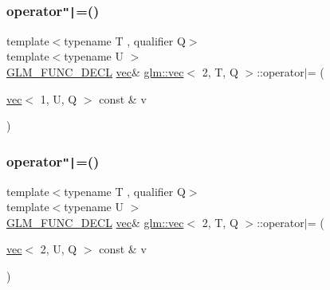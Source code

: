 \mbox{\label{structglm_1_1vec_3_012_00_01_t_00_01_q_01_4_aa5a9bdd476d4095d33cd04662df20fcb}} 
\subsubsection{\texorpdfstring{operator\texttt{"|}=()}{operator|=()}\hspace{0.1cm}{\footnotesize\ttfamily [2/6]}}
{\footnotesize\ttfamily template$<$typename T , qualifier Q$>$ \\
template$<$typename U $>$ \\
\mbox{\hyperlink{setup_8hpp_ab2d052de21a70539923e9bcbf6e83a51}{G\+L\+M\+\_\+\+F\+U\+N\+C\+\_\+\+D\+E\+CL}} \mbox{\hyperlink{structglm_1_1vec}{vec}}\& \mbox{\hyperlink{structglm_1_1vec}{glm\+::vec}}$<$ 2, T, Q $>$\+::operator$\vert$= (\begin{DoxyParamCaption}\item[{\mbox{\hyperlink{structglm_1_1vec}{vec}}$<$ 1, U, Q $>$ const \&}]{v }\end{DoxyParamCaption})}

\mbox{\label{structglm_1_1vec_3_012_00_01_t_00_01_q_01_4_ad50a7c0287c528e30aa091dd98595452}} 
\subsubsection{\texorpdfstring{operator\texttt{"|}=()}{operator|=()}\hspace{0.1cm}{\footnotesize\ttfamily [3/6]}}
{\footnotesize\ttfamily template$<$typename T , qualifier Q$>$ \\
template$<$typename U $>$ \\
\mbox{\hyperlink{setup_8hpp_ab2d052de21a70539923e9bcbf6e83a51}{G\+L\+M\+\_\+\+F\+U\+N\+C\+\_\+\+D\+E\+CL}} \mbox{\hyperlink{structglm_1_1vec}{vec}}\& \mbox{\hyperlink{structglm_1_1vec}{glm\+::vec}}$<$ 2, T, Q $>$\+::operator$\vert$= (\begin{DoxyParamCaption}\item[{\mbox{\hyperlink{structglm_1_1vec}{vec}}$<$ 2, U, Q $>$ const \&}]{v }\end{DoxyParamCaption})}

